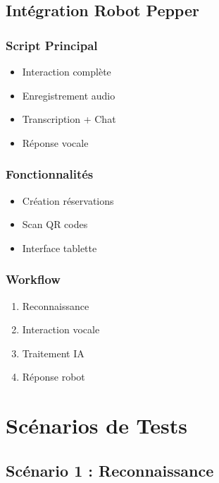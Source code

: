 \documentclass[12pt,a4paper]{article}
\begin{document}
\subsection{Intégration Robot Pepper}

\subsubsection{Script Principal}
\begin{itemize}
    \item Interaction complète
    \item Enregistrement audio
    \item Transcription + Chat
    \item Réponse vocale
\end{itemize}

\subsubsection{Fonctionnalités}
\begin{itemize}
    \item Création réservations
    \item Scan QR codes
    \item Interface tablette
\end{itemize}

\subsubsection{Workflow}
\begin{enumerate}
    \item Reconnaissance
    \item Interaction vocale
    \item Traitement IA
    \item Réponse robot
\end{enumerate}


\section{Scénarios de Tests}

\subsection{Scénario 1 : Reconnaissance}
\end{document}
